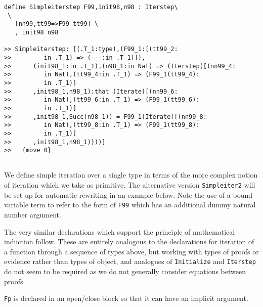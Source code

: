 \documentclass[12pt]{article}
\begin{document}
\begin{verbatim}
define Simpleiterstep F99,init98,n98 : Iterstep\
 \
   [nn99,tt99=>F99 tt99] \
   , init98 n98

>> Simpleiterstep: [(.T_1:type),(F99_1:[(tt99_2:
>>         in .T_1) => (---:in .T_1)]),
>>      (init98_1:in .T_1),(n98_1:in Nat) => (Iterstep([(nn99_4:
>>         in Nat),(tt99_4:in .T_1) => (F99_1(tt99_4):
>>         in .T_1)]
>>      ,init98_1,n98_1):that (Iterate([(nn99_6:
>>         in Nat),(tt99_6:in .T_1) => (F99_1(tt99_6):
>>         in .T_1)]
>>      ,init98_1,Succ(n98_1)) = F99_1(Iterate([(nn99_8:
>>         in Nat),(tt99_8:in .T_1) => (F99_1(tt99_8):
>>         in .T_1)]
>>      ,init98_1,n98_1))))]
>>   {move 0}


\end{verbatim}

We define simple iteration over a single type in terms of the more complex notion of iteration which we take as primitive.  The alternative version {\tt Simpleiter2} will be set up for automatic rewriting in an example below.  Note the use of a bound variable term to refer to the form of {\tt F99} which has an additional dummy natural number argument.

The very similar declarations which support the principle of mathematical induction follow.  These are entirely analogous to the declarations for iteration of a function through a sequence of types above, but working with types of proofs or evidence rather than types of object, and analogues of {\tt Initialize} and
{\tt Iterstep} do not seem to be required as we do not generally consider equations between proofs.

{\tt Fp} is declared in an open/close block so that it can have an implicit argument.
\end{document}
